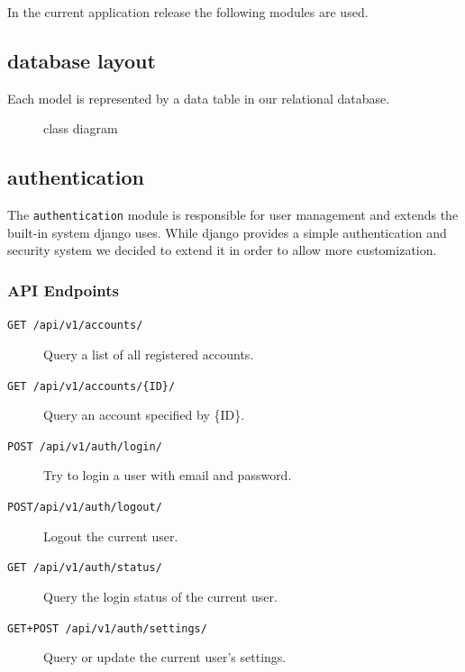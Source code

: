 In the current application release the following modules are used.

\subsection{database layout}\label{database-layout}

Each model is represented by a data table in our relational database.

\begin{figure}[htbp]
\centering
{}
\caption{class diagram}
\end{figure}

\subsection{authentication}\label{authentication}

The \texttt{authentication} module is responsible for user management
and extends the built-in system django uses. While django provides a
simple authentication and security system we decided to extend it in
order to allow more customization.

\subsubsection{API Endpoints}\label{api-endpoints}

\begin{description}
\item[\texttt{GET\ /api/v1/accounts/}] Query a list of all registered accounts.

\item[\texttt{GET\ /api/v1/accounts/\{ID\}/}] Query an account specified by
\{ID\}.

\item[\texttt{POST\ /api/v1/auth/login/}] Try to login a user with email and
password.

\item[\texttt{POST/api/v1/auth/logout/}] Logout the current user.

\item[\texttt{GET\ /api/v1/auth/status/}] Query the login status of the current
user.

\item[\texttt{GET+POST\ /api/v1/auth/settings/}] Query or update the current
user's settings.
\end{description}

